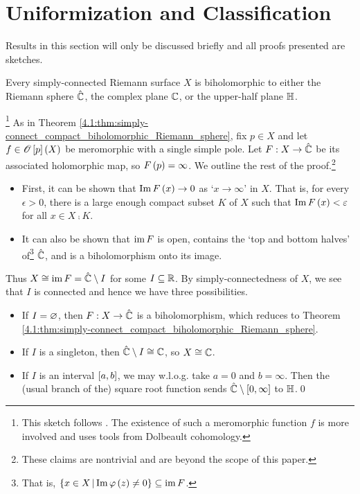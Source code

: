 \documentclass[../Moduli_Spaces_of_Riemann_Surfaces.tex]{subfiles}
\begin{document}
    \section{Uniformization and Classification}\label{sec:uniformization}
    Results in this section will only be discussed briefly and all proofs presented are sketches.
    \begin{theorem}[Uniformization]
        Every simply-connected Riemann surface $X$ is biholomorphic to either the Riemann sphere $\RS$, the complex plane $\C$, or the upper-half plane $\H$.
    \end{theorem}
    \begin{proofsketch}\footnote{This sketch follows \cite{peter}. The existence of such a meromorphic function $f$ is more involved and uses tools from Dolbeault cohomology.}
        As in Theorem \ref{4.1:thm:simply-connect_compact_biholomorphic_Riemann_sphere}, fix $p\in X$ and let $f\in\HOLO\l[p\r]\l(X\r)$ be meromorphic with a single simple pole. Let $F:X\to\RS$ be its associated holomorphic map, so $F\l(p\r)=\infty$. We outline the rest of the proof.\footnote{These claims are nontrivial and are beyond the scope of this paper.}
        \begin{itemize}
            \item First, it can be shown that $\Im F\l(x\r)\to0$ as `$x\to\infty$' in $X$. That is, for every $\epsilon>0$, there is a large enough compact subset $K$ of $X$ such that $\Im F\l(x\r)<\epsilon$ for all $x\in X\comp K$.
                \vspace{-0.05in}
            \item It can also be shown that $\im F$ is open, contains the `top and bottom halves' of\footnote{That is, $\l\{x\in X\mid\Im\phi\l(z\r)\neq0\r\}\subseteq\im F$.} $\RS$, and is a biholomorphism onto its image.
        \end{itemize}
        Thus $X\iso\im F=\RS\comp I$ for some $I\subseteq\R$. By simply-connectedness of $X$, we see that $I$ is connected and hence we have three possibilities.
        \begin{itemize}
            \item If $I=\em$, then $F:X\to\RS$ is a biholomorphism, which reduces to Theorem \ref{4.1:thm:simply-connect_compact_biholomorphic_Riemann_sphere}.
                \vspace{-0.05in}
            \item If $I$ is a singleton, then $\RS\comp I\iso\C$, so $X\iso\C$.
                \vspace{-0.05in}
            \item If $I$ is an interval $\l[a,b\r]$, we may w.l.o.g. take $a=0$ and $b=\infty$. Then the (usual branch of the) square root function sends $\RS\comp\l[0,\infty\r]$ to $\H$.\qed
        \end{itemize}
    \end{proofsketch}
\end{document}
